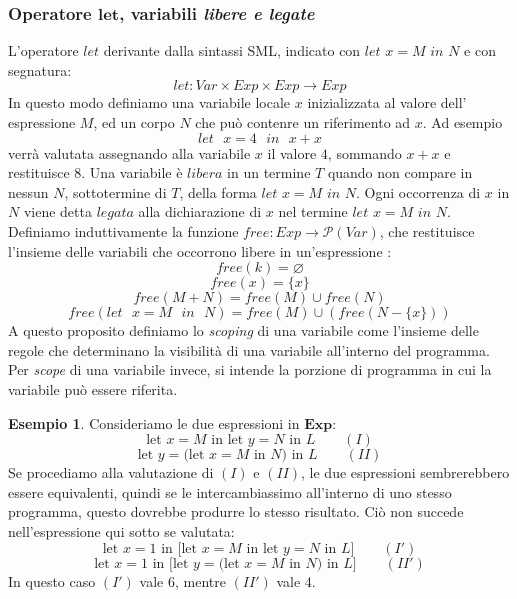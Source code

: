 \documentclass{article}
\theoremstyle{definition}
\theoremstyle{definition}
\theoremstyle{definition}
\newtheorem{example}[theorem]{Esempio}
\theoremstyle{remark}
\begin{document}
\subsubsection{Operatore $\boldsymbol{let}$, variabili \textit{libere e legate}}
L'operatore $let$ derivante dalla sintassi SML, indicato con $let$ $x=M$ $in$ $N$ e con segnatura:
$$let : Var \times Exp\times Exp\to Exp$$
In questo modo definiamo una variabile locale $x$ inizializzata al valore dell' espressione $M$, ed un corpo $N$ che può contenre un riferimento ad $x$. Ad esempio
$$\text{$let$ $x=4$ $in$ $x+x$}$$
verrà valutata assegnando alla variabile $x$ il valore $4$, sommando $x+x$ e restituisce $8$.
Una variabile  è $libera$ in un termine $T$ quando non compare in nessun $N$, sottotermine di $T$, della forma $let$ $x=M$ $in$ $N$.
Ogni occorrenza di $x$ in $N$ viene detta $legata$ alla dichiarazione di $x$ nel termine $let$ $x=M$ $in$ $N$.
Definiamo induttivamente la funzione $free:Exp\to \mathcal{P}(Var)$, che restituisce l'insieme delle variabili  che occorrono libere in un'espressione :
$$free(k) = \varnothing$$
$$free(x) = \{x\}$$
$$free(M+N) = free(M)\cup free(N)$$
$$free(\text{$let$ $x=M$ $in$ $N$}) = free(M) \cup (free(N-\{x\}))$$
A questo proposito definiamo lo \textit{scoping} di una variabile come l'insieme delle regole che determinano la
visibilità di una variabile all'interno del programma. Per \textit{scope} di una variabile invece, si intende la porzione di programma in cui la
variabile può essere riferita.
\begin{example}
    Consideriamo le due espressioni in $\boldsymbol{Exp}$:
    $$\text{let $x=M$ in let $y=N$ in $L$}  \qquad(I)$$
    $$\text{let $y=$(let $x=M$ in $N$) in $L$}\qquad (II)$$
    Se procediamo alla valutazione di $(I)$ e $(II)$, le due espressioni
    sembrerebbero essere equivalenti, quindi se le intercambiassimo all'interno
    di uno stesso programma, questo dovrebbe produrre lo stesso risultato. Ciò non
    succede nell'espressione qui sotto se valutata:
    $$\text{let $x=1$ in [let $x=M$ in let $y=N$ in $L$]}  \qquad(I')$$
    $$\text{let $x=1$ in [let $y=$(let $x=M$ in $N$) in $L$]}\qquad (II')$$
    In questo caso $(I')$ vale $6$, mentre $(II')$ vale $4$.

\end{example}
\end{document}
